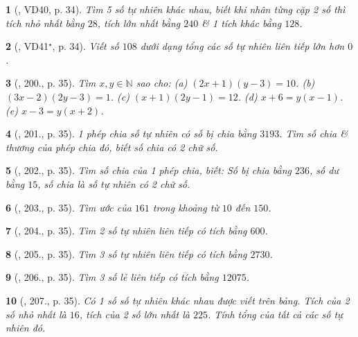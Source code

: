 \documentclass{article}
\newtheorem{baitoan}{}
\begin{document}
\begin{baitoan}[\cite{Binh_Toan_6_tap_1}, VD40, p. 34]
	Tìm 5 số tự nhiên khác nhau, biết khi nhân từng cặp 2 số thì tích nhỏ nhất bằng $28$, tích lớn nhất bằng $240$ \& 1 tích khác bằng $128$.
\end{baitoan}

\begin{baitoan}[\cite{Binh_Toan_6_tap_1}, VD41${}^\star$, p. 34]
	Viết số $108$ dưới dạng tổng các số tự nhiên liên tiếp lớn hơn $0$.
\end{baitoan}

\begin{baitoan}[\cite{Binh_Toan_6_tap_1}, 200., p. 35]
	Tìm $x,y\in\mathbb{N}$ sao cho: (a) $(2x + 1)(y - 3) = 10$. (b) $(3x - 2)(2y - 3) = 1$. (c) $(x + 1)(2y - 1) = 12$. (d) $x + 6 = y(x - 1)$. (e) $x - 3 = y(x + 2)$.
\end{baitoan}

\begin{baitoan}[\cite{Binh_Toan_6_tap_1}, 201., p. 35]
	1 phép chia số tự nhiên có số bị chia bằng $3193$. Tìm số chia \& thương của phép chia đó, biết số chia có 2 chữ số.
\end{baitoan}

\begin{baitoan}[\cite{Binh_Toan_6_tap_1}, 202., p. 35]
	Tìm số chia của 1 phép chia, biết: Số bị chia bằng $236$, số dư bằng $15$, số chia là số tự nhiên có 2 chữ số.
\end{baitoan}	

\begin{baitoan}[\cite{Binh_Toan_6_tap_1}, 203., p. 35]
	Tìm ước của $161$ trong khoảng từ $10$ đến $150$.
\end{baitoan}

\begin{baitoan}[\cite{Binh_Toan_6_tap_1}, 204., p. 35]
	Tìm 2 số tự nhiên liên tiếp có tích bằng $600$.
\end{baitoan}

\begin{baitoan}[\cite{Binh_Toan_6_tap_1}, 205., p. 35]
	Tìm 3 số tự nhiên liên tiếp có tích bằng $2730$.
\end{baitoan}

\begin{baitoan}[\cite{Binh_Toan_6_tap_1}, 206., p. 35]
	Tìm 3 số lẻ liên tiếp có tích bằng $12075$.
\end{baitoan}

\begin{baitoan}[\cite{Binh_Toan_6_tap_1}, 207., p. 35]
	Có 1 số số tự nhiên khác nhau được viết trên bảng. Tích của 2 số nhỏ nhất là $16$, tích của 2 số lớn nhất là $225$. Tính tổng của tất cả các số tự nhiên đó.
\end{baitoan}
\end{document}
